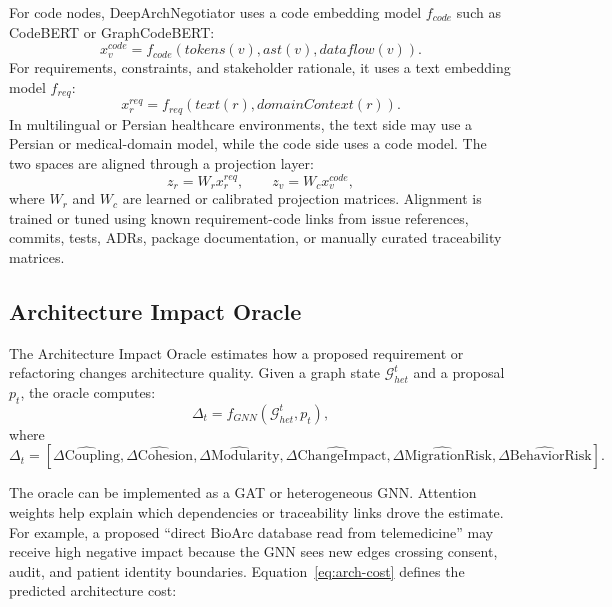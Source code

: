 \documentclass[english,preprint,nonatbib]{elsarticle}
\newcommand{\Ghet}{\mathcal{G}_{het}}
\begin{document}
For code nodes, DeepArchNegotiator uses a code embedding model $f_{code}$ such as CodeBERT or GraphCodeBERT:
\begin{equation}
    x_v^{code} = f_{code}(tokens(v), ast(v), dataflow(v)).
\end{equation}
For requirements, constraints, and stakeholder rationale, it uses a text embedding model $f_{req}$:
\begin{equation}
    x_r^{req} = f_{req}(text(r), domainContext(r)).
\end{equation}
In multilingual or Persian healthcare environments, the text side may use a Persian or medical-domain model, while the code side uses a code model.
The two spaces are aligned through a projection layer:
\begin{equation}
    z_r = W_r x_r^{req}, \qquad z_v = W_c x_v^{code},
\end{equation}
where $W_r$ and $W_c$ are learned or calibrated projection matrices.
Alignment is trained or tuned using known requirement-code links from issue references, commits, tests, ADRs, package documentation, or manually curated traceability matrices.

\subsection{Architecture Impact Oracle}

The Architecture Impact Oracle estimates how a proposed requirement or refactoring changes architecture quality.
Given a graph state $\Ghet^t$ and a proposal $p_t$, the oracle computes:
\begin{equation}
    \Delta_t = f_{GNN}(\Ghet^t, p_t),
\end{equation}
where
\begin{equation}
    \Delta_t = \left[ \widehat{\Delta\text{Coupling}}, \widehat{\Delta\text{Cohesion}}, \widehat{\Delta\text{Modularity}}, \widehat{\Delta\text{ChangeImpact}}, \widehat{\Delta\text{MigrationRisk}}, \widehat{\Delta\text{BehaviorRisk}} \right].
\end{equation}


The oracle can be implemented as a GAT or heterogeneous GNN\@.
Attention weights help explain which dependencies or traceability links drove the estimate.
For example, a proposed ``direct BioArc database read from telemedicine'' may receive high negative impact because the GNN sees new edges crossing consent, audit, and patient identity boundaries.
Equation~\ref{eq:arch-cost} defines the predicted architecture cost:
\end{document}

